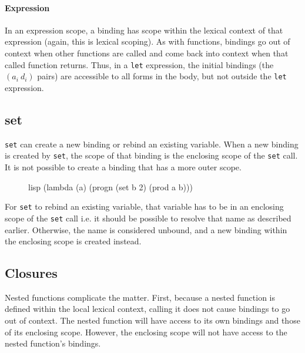 \documentclass[a4paper, 12pt]{article}
\begin{document}
\paragraph{Expression}
In an expression scope, a binding has scope within the lexical context of that expression (again, this is lexical scoping). As with functions, bindings go out of context when other functions are called and come back into context when that called function returns. Thus, in a \texttt{let} expression, the initial bindings (the $(a_i\ d_i)$ pairs) are accessible to all forms in the body, but not outside the \texttt{let} expression.

\subsection{set}
\texttt{set} can create a new binding or rebind an existing variable. When a new binding is created by \texttt{set}, the scope of that binding is the enclosing scope of the \texttt{set} call. It is not possible to create a binding that has a more outer scope.

\begin{figure}[htp]
    \centering
    \begin{cminted}[autogobble=true, escapeinside=??]{lisp}
        (lambda (a) (progn (set b 2) (prod a b)))
    \end{cminted}
    \captionsetup[figure]{font=small}
\end{figure}

For \texttt{set} to rebind an existing variable, that variable has to be in an enclosing scope of the \texttt{set} call i.e. it should be possible to resolve that name as described earlier. Otherwise, the name is considered unbound, and a new binding within the enclosing scope is created instead.

\subsection{Closures}
Nested functions complicate the matter. First, because a nested function is defined within the local lexical context, calling it does not cause bindings to go out of context. The nested function will have access to its own bindings and those of its enclosing scope. However, the enclosing scope will not have access to the nested function's bindings.
\end{document}
